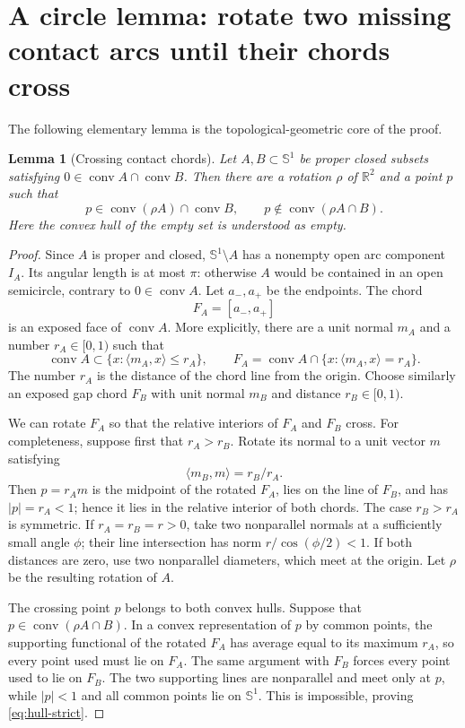 \documentclass[11pt]{amsart}
\newtheorem{lemma}[theorem]{Lemma}
\theoremstyle{definition}
\theoremstyle{remark}
\newcommand{\R}{\mathbb R}
\newcommand{\Sph}{\mathbb S^1}
\newcommand{\conv}{\operatorname{conv}}
\newcommand{\ip}[2]{\langle #1,#2\rangle}
\begin{document}
\section{A circle lemma: rotate two missing contact arcs until their chords cross}
\label{sec:circle}

The following elementary lemma is the topological-geometric core of the proof.

\begin{lemma}[Crossing contact chords]\label{lem:chords}
Let $A,B\subset\Sph$ be proper closed subsets satisfying
$0\in\conv A\cap\conv B$.  Then there are a rotation $\rho$ of $\R^2$ and a
point $p$ such that
\begin{equation}\label{eq:hull-strict}
 p\in\conv(\rho A)\cap\conv B,
 \qquad
 p\notin\conv(\rho A\cap B).
\end{equation}
Here the convex hull of the empty set is understood as empty.
\end{lemma}

\begin{proof}
Since $A$ is proper and closed, $\Sph\setminus A$ has a nonempty open arc
component $I_A$.  Its angular length is at most $\pi$: otherwise $A$ would be
contained in an open semicircle, contrary to $0\in\conv A$.  Let $a_-,a_+$ be
the endpoints.  The chord
\[
 F_A=[a_-,a_+]
\]
is an exposed face of $\conv A$.  More explicitly, there are a unit normal
$m_A$ and a number $r_A\in[0,1)$ such that
\[
 \conv A\subset\{x:\ip{m_A}{x}\le r_A\},
 \qquad
 F_A=\conv A\cap\{x:\ip{m_A}{x}=r_A\}.
\]
The number $r_A$ is the distance of the chord line from the origin.  Choose
similarly an exposed gap chord $F_B$ with unit normal $m_B$ and distance
$r_B\in[0,1)$.

We can rotate $F_A$ so that the relative interiors of $F_A$ and $F_B$ cross.
For completeness, suppose first that $r_A>r_B$.  Rotate its normal to a unit
vector $m$ satisfying
\[
 \ip{m_B}{m}=r_B/r_A.
\]
Then $p=r_A m$ is the midpoint of the rotated $F_A$, lies on the line of
$F_B$, and has $|p|=r_A<1$; hence it lies in the relative interior of both
chords.  The case $r_B>r_A$ is symmetric.  If $r_A=r_B=r>0$, take two
nonparallel normals at a sufficiently small angle $\phi$; their line
intersection has norm $r/\cos(\phi/2)<1$.  If both distances are zero, use two
nonparallel diameters, which meet at the origin.  Let $\rho$ be the resulting
rotation of $A$.

The crossing point $p$ belongs to both convex hulls.  Suppose that
$p\in\conv(\rho A\cap B)$.  In a convex representation of $p$ by common
points, the supporting functional of the rotated $F_A$ has average equal to
its maximum $r_A$, so every point used must lie on $F_A$.  The same argument
with $F_B$ forces every point used to lie on $F_B$.  The two supporting lines
are nonparallel and meet only at $p$, while $|p|<1$ and all common points lie
on $\Sph$.  This is impossible, proving \eqref{eq:hull-strict}.
\end{proof}
\end{document}
